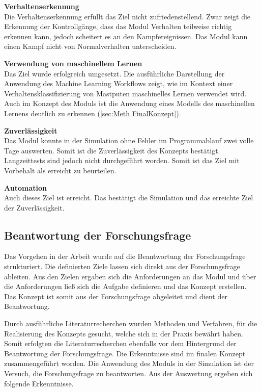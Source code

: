 \textbf{Verhaltenserkennung}\\
Die Verhaltenserkennung erfüllt das Ziel nicht zufriedenstellend. Zwar zeigt die Erkennung der Kontrollgänge, dass das Modul Verhalten teilweise richtig erkennen kann, jedoch scheitert es an den Kampfereignissen. Das Modul kann einen Kampf nicht von Normalverhalten unterscheiden. \par

\textbf{Verwendung von maschinellem Lernen}\\
Das Ziel wurde erfolgreich umgesetzt. Die ausführliche Darstellung der Anwendung des Machine Learning Workflows zeigt, wie im Kontext einer Verhaltensklassifizierung von Mastputen maschinelles Lernen verwendet wird. Auch im Konzept des Moduls ist die Anwendung eines Modells des maschinellen Lernens deutlich zu erkennen (\ref{sec:Meth FinalKonzept}). \par

\textbf{Zuverlässigkeit}\\
Das Modul konnte in der Simulation ohne Fehler im Programmablauf zwei volle Tage auswerten. Somit ist die Zuverlässigkeit des Konzepts bestätigt. Langzeittests sind jedoch nicht durchgeführt worden. Somit ist das Ziel mit Vorbehalt als erreicht zu beurteilen. 
\par

\textbf{Automation}\\
Auch dieses Ziel ist erreicht. Das bestätigt die Simulation und das erreichte Ziel der Zuverlässigkeit.\par



\subsection{Beantwortung der Forschungsfrage}
Das Vorgehen in der Arbeit wurde auf die Beantwortung der Forschungsfrage strukturiert. Die definierten Ziele lassen sich direkt aus der Forschungsfrage ableiten. Aus den Zielen ergaben sich die Anforderungen an das Modul und über die Anforderungen ließ sich die Aufgabe definieren und das Konzept erstellen. Das Konzept ist somit aus der Forschungsfrage abgeleitet und dient der Beantwortung. \par

Durch ausführliche Literaturrecherchen wurden Methoden und Verfahren, für die Realisierung des Konzepts gesucht, welche sich in der Praxis bewährt haben. Somit erfolgten die Literaturrecherchen ebenfalls vor dem Hintergrund der Beantwortung der Forschungsfrage. Die Erkenntnisse sind im finalen Konzept zusammengeführt worden. Die Anwendung des Moduls in der Simulation ist der Versuch, die Forschungsfrage zu beantworten. Aus der Auswertung ergeben sich folgende Erkenntnisse.\par

